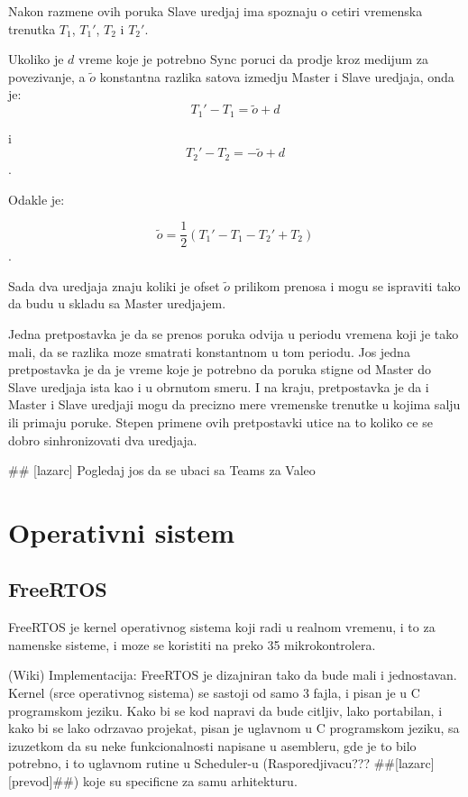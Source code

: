 \documentclass[a4paper,12pt, master]{etf}
\begin{document}
	Nakon razmene ovih poruka Slave uredjaj ima spoznaju o cetiri vremenska trenutka $T_1$, $T_1'$,
	$T_2$ i $T_2'$.

	Ukoliko je $d$ vreme koje je potrebno Sync poruci da prodje kroz medijum za povezivanje, a $\tilde{o}$
	konstantna razlika satova izmedju Master i Slave uredjaja, onda je:
	\begin{equation}
		T_1' - T_1 = \tilde{o} + d
	\end{equation}

	i
	\begin{equation}
			T_2' - T_2 = -\tilde{o} + d
	\end{equation}.

	Odakle je:

	\begin{equation}
		\tilde{o}=\frac{1}{2}(T_1' - T_1 - T_2' + T_2)
	\end{equation}.

	Sada dva uredjaja znaju koliki je ofset $\tilde{o}$ prilikom prenosa i mogu se ispraviti tako da budu
	u skladu sa Master uredjajem.

	Jedna pretpostavka je da se prenos poruka odvija u periodu vremena koji je tako mali, da se
	razlika moze smatrati konstantnom u tom periodu. Jos jedna pretpostavka je da je vreme koje je
	potrebno da poruka stigne od Master do Slave uredjaja ista kao i u obrnutom smeru. I na kraju,
	pretpostavka je da i Master i Slave uredjaji mogu da precizno mere vremenske trenutke u kojima
	salju ili primaju poruke. Stepen primene ovih pretpostavki utice na to koliko ce se dobro
	sinhronizovati dva uredjaja.

	\#\# [lazarc] Pogledaj jos da se ubaci sa Teams za Valeo

	\newpage

	\chapter{Operativni sistem}

	\section{FreeRTOS}

	FreeRTOS je kernel operativnog sistema koji radi u realnom vremenu, i to za namenske sisteme, i
	moze se koristiti na preko 35 mikrokontrolera.

	(Wiki) Implementacija:
	FreeRTOS je dizajniran tako da bude mali i jednostavan. Kernel (srce operativnog sistema) se
	sastoji od samo 3 fajla, i pisan je u C programskom jeziku. Kako bi se kod napravi da bude
	citljiv, lako portabilan, i kako bi se lako odrzavao projekat, pisan je uglavnom u C
	programskom jeziku, sa izuzetkom da su neke funkcionalnosti napisane u asembleru, gde je to
	bilo potrebno, i to uglavnom rutine u Scheduler-u (Rasporedjivacu??? \#\#[lazarc] [prevod]\#\#)
	koje su specificne za samu arhitekturu.
\end{document}
